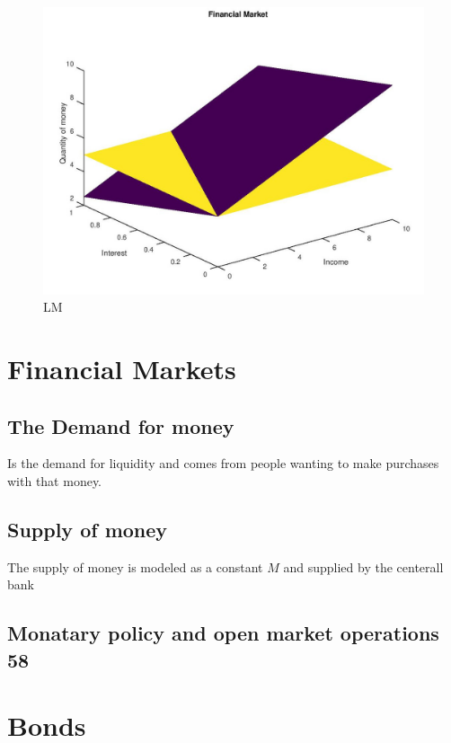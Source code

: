 \documentclass{tufte-book}
\begin{document}
\begin{figure}
\centering
\includegraphics[width=\textwidth,height=1\textwidth]{pics/IS.jpg}
\caption{LM}
\end{figure}\hypertarget{financial-markets}{%
\section{Financial Markets}\label{financial-markets}}

\hypertarget{the-demand-for-money}{%
\subsection{The Demand for money}\label{the-demand-for-money}}

Is the demand for liquidity and comes from people wanting to make
purchases with that money.

\hypertarget{supply-of-money}{%
\subsection{Supply of money}\label{supply-of-money}}

The supply of money is modeled as a constant \(M\) and supplied by the
centerall bank

\hypertarget{monatary-policy-and-open-market-operations-58}{%
\subsection{Monatary policy and open market operations
58}\label{monatary-policy-and-open-market-operations-58}}\hypertarget{bonds}{%
\section{Bonds}\label{bonds}}
\end{document}
